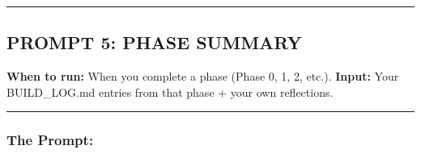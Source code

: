 \documentclass[
  11pt,
]{article}
\begin{document}
\begin{center}\rule{0.5\linewidth}{0.5pt}\end{center}

\hypertarget{prompt-5-phase-summary}{%
\subsection{PROMPT 5: PHASE SUMMARY}\label{prompt-5-phase-summary}}

\textbf{When to run:} When you complete a phase (Phase 0, 1, 2, etc.).
\textbf{Input:} Your BUILD\_LOG.md entries from that phase + your own
reflections.

\begin{center}\rule{0.5\linewidth}{0.5pt}\end{center}

\hypertarget{the-prompt-4}{%
\subsubsection{The Prompt:}\label{the-prompt-4}}
\end{document}
